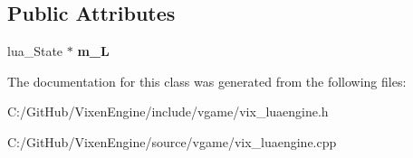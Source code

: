 \subsection*{Public Attributes}
\begin{DoxyCompactItemize}
\item 
\hypertarget{class_vixen_1_1_lua_engine_a42ec6b6026f72abbbdd2614c76a7ce02}{}lua\+\_\+\+State $\ast$ {\bfseries m\+\_\+\+L}\label{class_vixen_1_1_lua_engine_a42ec6b6026f72abbbdd2614c76a7ce02}

\end{DoxyCompactItemize}


The documentation for this class was generated from the following files\+:\begin{DoxyCompactItemize}
\item 
C\+:/\+Git\+Hub/\+Vixen\+Engine/include/vgame/vix\+\_\+luaengine.\+h\item 
C\+:/\+Git\+Hub/\+Vixen\+Engine/source/vgame/vix\+\_\+luaengine.\+cpp\end{DoxyCompactItemize}
